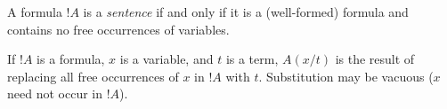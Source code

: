 \documentclass[open-logic-section]{subfiles}
\begin{document}
\begin{defn}[Sentence]
A formula $!A$ is a \emph{sentence} if and only if it is a
(well-formed) formula and contains no free occurrences of variables.
\end{defn}


\begin{defn}
If $!A$ is a formula, $x$ is a variable, and $t$ is a term, $A(x/t)$
is the result of replacing all free occurrences of $x$ in $!A$ with
$t$. Substitution may be vacuous ($x$ need not occur in $!A$).
\end{defn}
\end{document}
